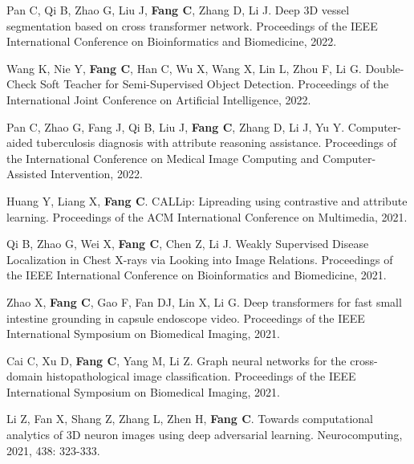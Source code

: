 \documentclass[a4paper,36pt]{article}
\newcommand{\tb}[1]{\textbf{#1}}
\newcommand{\resumeItemWithoutTitle}[1]{
  \item\justifying\small{
    {#1 \vspace{-2pt}}
  }
}
\begin{document}
\resumeItemWithoutTitle{Pan C, Qi B, Zhao G, Liu J, \tb{Fang C}, Zhang D, Li J. Deep 3D vessel segmentation based on cross transformer network. Proceedings of the IEEE International Conference on Bioinformatics and Biomedicine, 2022. }

\resumeItemWithoutTitle{Wang K, Nie Y, \tb{Fang C}, Han C, Wu X, Wang X, Lin L, Zhou F, Li G. Double-Check Soft Teacher for Semi-Supervised Object Detection. Proceedings of the International Joint Conference on Artificial Intelligence, 2022.}


\resumeItemWithoutTitle{Pan C, Zhao G, Fang J, Qi B, Liu J, \tb{Fang C}, Zhang D, Li J, Yu Y. Computer-aided tuberculosis diagnosis with attribute reasoning assistance. Proceedings of the International Conference on Medical Image Computing and Computer-Assisted Intervention, 2022. }


\resumeItemWithoutTitle{Huang Y, Liang X, \tb{Fang C}. CALLip: Lipreading using contrastive and attribute learning. Proceedings of the ACM International Conference on Multimedia, 2021.}

\resumeItemWithoutTitle{Qi B, Zhao G, Wei X, \tb{Fang C}, Chen Z, Li J. Weakly Supervised Disease Localization in Chest X-rays via Looking into Image Relations. Proceedings of the IEEE International Conference on Bioinformatics and Biomedicine, 2021.}

\resumeItemWithoutTitle{Zhao X, \tb{Fang C}, Gao F, Fan DJ, Lin X, Li G. Deep transformers for fast small intestine grounding in capsule endoscope video. Proceedings of the IEEE International Symposium on Biomedical Imaging, 2021.}

\resumeItemWithoutTitle{Cai C, Xu D, \tb{Fang C}, Yang M, Li Z. Graph neural networks for the cross-domain histopathological image classification. Proceedings of the IEEE International Symposium on Biomedical Imaging, 2021.}

\resumeItemWithoutTitle{Li Z, Fan X, Shang Z, Zhang L, Zhen H, \tb{Fang C}. Towards computational analytics of 3D neuron images using deep adversarial learning. Neurocomputing, 2021, 438: 323-333.}
\end{document}
